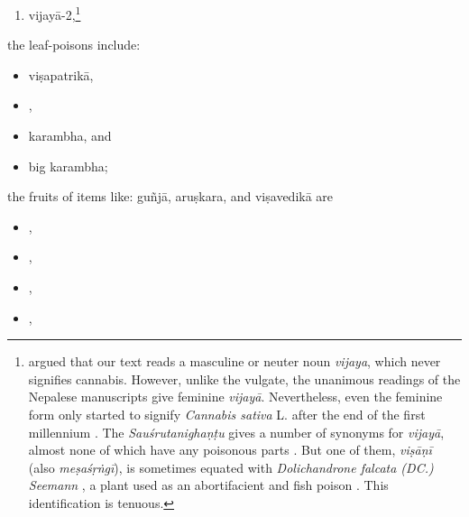 \begin{translation}
\begin{itemize}
\begin{enumerate}
\item \gls{vijayā-2},\footnote{\citet[61, n.\,3]{meul-sear} argued that
    our text reads a masculine or neuter noun \emph{vijaya}, which never
    signifies cannabis. However, unlike the vulgate, the unanimous
    readings of the Nepalese manuscripts give feminine \emph{vijayā}. 
    Nevertheless, even the feminine form only started to signify
    \emph{Cannabis sativa} L. after the end of the first millennium
    \citep{meul-sear,wuja-cann,mchu-2021}. The \emph{Sauśrutanighaṇṭu}
    gives a number of synonyms for \emph{vijayā}, almost none of which
    have any poisonous parts \citep[5.77, 10.143]{suve-2000}.  But one of
    them, \emph{viṣāṇī} (also \emph{meṣaśṛṅgī}), is sometimes equated with
    \emph{Dolichandrone falcata (DC.) Seemann} \citep[518]{adps}, a plant
    used as an abortifacient and fish poison \citep[\#862]{NK}.  This
    identification is tenuous.} %
        \end{enumerate}
        \end{itemize}
    
        \item
        the leaf-poisons include:
             \begin{itemize}            
        \item \gls{viṣapatrikā},
        \item {},
        \item \gls{karambha},
        and
        \item big \gls{karambha};
            \end{itemize}

        \item
        the fruits of items like:
        \gls{guñjā},
        \gls{aruṣkara},
        and
        \gls{viṣavedikā}
        are
\begin{itemize}
         \item {},	
         
        \item {},
        
    \item {},

    \item {},
    

\end{itemize}
\end{translation}

